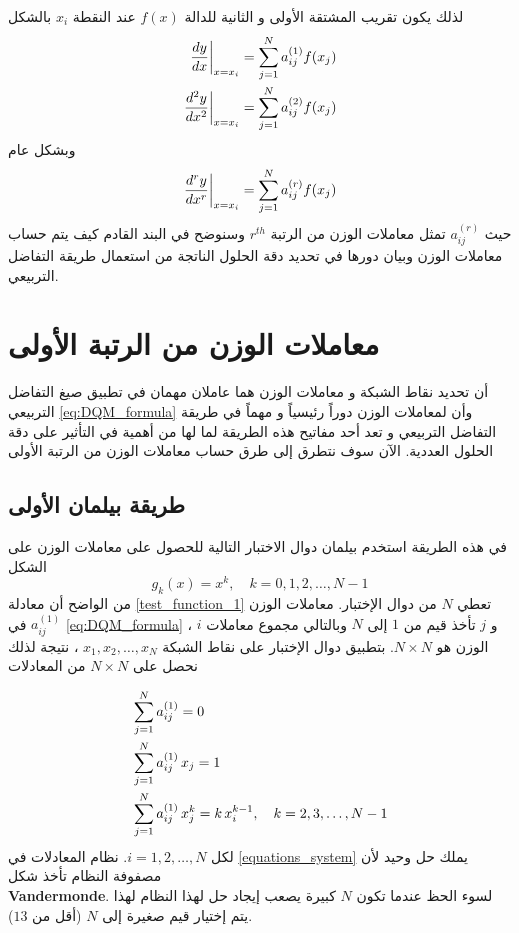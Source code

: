 لذلك يكون تقريب المشتقة الأولى و الثانية للدالة $f(x)$ عند النقطة $x_i$ بالشكل
\begin{align}
	\left.\frac{dy}{dx}\right|_{x=x_i}=\sum_{j=1}^{N}a_{ij}^{(1)}f(x_j) \label{eq:firstorderDQM}\\
	\left.\frac{d^2y}{dx^2}\right|_{x=x_i}=\sum_{j=1}^{N}a_{ij}^{(2)}f(x_j) \label{eq:secondorderDQM}
\end{align}
وبشكل عام
\begin{equation}
	\label{eq:DQM_formula}
	\left.\frac{d^ry}{dx^r}\right|_{x=x_i}=\sum_{j=1}^{N}a_{ij}^{(r)}f(x_j)
\end{equation}
حيث $a_{ij}^{(r)}$ تمثل معاملات الوزن من الرتبة $r^{th}$ وسنوضح في البند القادم كيف يتم حساب معاملات الوزن وبيان دورها في تحديد دقة الحلول الناتجة من استعمال طريقة التفاضل التربيعي.

\section[معاملات الوزن من الرتبة الأولى]{معاملات الوزن من الرتبة الأولى }

أن تحديد نقاط الشبكة و معاملات الوزن هما عاملان مهمان في تطبيق صيغ التفاضل التربيعي \eqref{eq:DQM_formula} وأن لمعاملات الوزن دوراً رئيسياً و مهماً في طريقة التفاضل التربيعي و تعد أحد مفاتيح هذه الطريقة لما لها من أهمية في التأثير على دقة الحلول العددية. الآن سوف نتطرق إلى طرق حساب معاملات الوزن من الرتبة الأولى


\subsection[طريقة بيلمان الأولى]{طريقة بيلمان الأولى \cite{Bellman} }

في هذه الطريقة استخدم بيلمان دوال الاختبار التالية للحصول على معاملات الوزن على الشكل
\begin{equation}
	\label{test_function_1}
	g_k(x)=x^k,\quad k =0,1,2,\dots,N-1
\end{equation}
من الواضح أن معادلة \eqref{test_function_1} تعطي $N$ من دوال الإختبار. معاملات الوزن $a_{ij}^{(1)}$ في \eqref{eq:DQM_formula} ، $i$ و $j$ تأخذ قيم من $1$ إلى $N$ وبالتالي مجموع معاملات الوزن هو $N\times N$. بتطبيق دوال الإختبار على نقاط الشبكة $x_1,x_2,\dots,x_N$ ، نتيجة لذلك نحصل على $N\times N$ من المعادلات

\begin{align}
	\label{equations_system}
	&\sum_{j=1}^{N}a_{ij}^{(1)}=0\notag\\
	&\sum_{j=1}^{N}a_{ij}^{(1)}\,x_j=1\\
	&\sum_{j=1}^{N}a_{ij}^{(1)}\,x_j^k=k\,x_i^{k-1},\quad k=2,3,\dots,N-1\notag
\end{align}
لكل $i=1,2,\dots,N$. نظام المعادلات في \eqref{equations_system} يملك حل وحيد لأن مصفوفة النظام تأخذ شكل \\\textbf{Vandermonde}. لسوء الحظ عندما تكون $N$ كبيرة يصعب إيجاد حل لهذا النظام لهذا يتم إختيار قيم صغيرة إلى $N$ (أقل من $13$).

